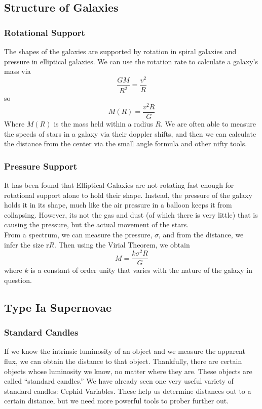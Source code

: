 \documentclass{article}
\begin{document}
	\subsection{Structure of Galaxies}
	 \subsubsection{Rotational Support} The shapes of the galaxies are supported by rotation in spiral galaxies and pressure in elliptical galaxies. We can use the rotation rate to calculate a galaxy's mass via
	 $$\frac{GM}{R^2}=\frac{v^2}{R}$$
	 so $$M(R)=\frac{v^2 R}{G}$$
	 Where $M(R)$ is the mass held within a radius $R$. We are often able to measure the speeds of stars in a galaxy via their doppler shifts, and then we can calculate the distance from the center via the small angle formula and other nifty tools.
	 \subsubsection{Pressure Support}
	 It has been found that Elliptical Galaxies are not rotating fast enough for rotational support alone to hold their shape. Instead, the pressure of the galaxy holds it in its shape, much like the air pressure in a balloon keeps it from collapsing. However, its not the gas and dust (of which there is very little) that is causing the pressure, but the actual movement of the stars.\\
	 
	 \noindent From a spectrum, we can measure the pressure, $\sigma$, and from the distance, we infer the size r$R$. Then using the Virial Theorem, we obtain
	 $$M=\frac{k\sigma^2R}{G}$$
	 where $k$ is a constant of order unity that varies with the nature of the galaxy in question.
	 \subsection{Type Ia Supernovae}
	 \subsubsection{Standard Candles}
	 If we know the intrinsic luminosity of an object and we measure the apparent flux, we can obtain the distance to that object. Thankfully, there are certain objects whose luminosity we know, no matter where they are. These objects are called ``standard candles.'' We have already seen one very useful variety of standard candles: Cephid Variables. These help us determine distances out to a certain distance, but we need more powerful tools to prober further out.
\end{document}
